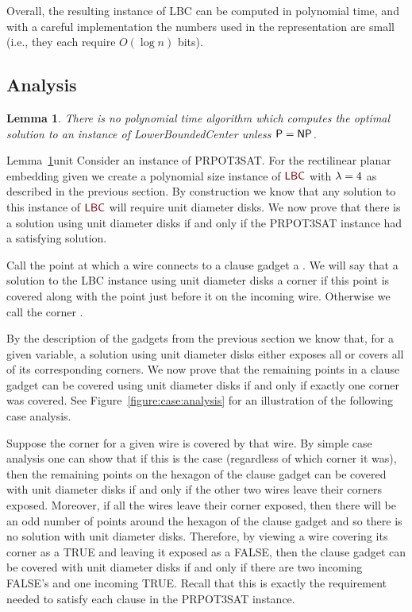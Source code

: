 \ifx\STACS\undefined \documentclass[12pt]{article}\else \documentclass[runningheads,a4paper]{llncs}
\newcommand{\PRPOTSAT}{\Term{PRPOT3SAT}\xspace}
\newcommand{\True}{\Term{TRUE}\xspace}
\newcommand{\False}{\Term{FALSE}\xspace}
\newcommand{\LowerBoundedCenter}   {\PStyle{{Lower{}Bounded{}Center}}\xspace}
\newcommand{\lbc}{\PStyle{LBC}\xspace}
\newcommand{\emphi}[1]{\emphic{#1}{#1}}
\newcommand{\PStyle}[1]{\textcolor{red25}{\textrm{\textsf{#1}}}}
\newtheorem{lemma}[theorem]{Lemma}\newtheorem{definition}[theorem]{Definition}
\newcommand{\Term}[1]{\textsf{#1}}
\newcommand{\lemlab}[1]{\label{lemma:#1}}
\newcommand{\lemref}[1]{Lemma~\ref{lemma:#1}}
\newcommand{\figref}[1]{Figure~\ref{figure:#1}}
\begin{document}
Overall, the resulting instance of \lbc can be computed in polynomial
time, and with a careful implementation the numbers used in the
representation are small (i.e., they each require $O( \log n)$ bits).

\subsection{Analysis}

\begin{lemma}
\lemlab{unit}
    There is no polynomial time algorithm which computes
    the optimal solution to an instance of \LowerBoundedCenter unless
    $\P=\NP$.
\end{lemma}

\begin{proof:in:appendix:e}{\lemref{unit}}{unit}
    Consider an instance of \PRPOTSAT.  For the rectilinear planar
    embedding given we create a polynomial size instance of $\lbc$
    with $\lambda=4$ as described in the previous section.  By
    construction we know that any solution to this instance of $\lbc$
    will require unit diameter disks.  We now prove that there is a
    solution using unit diameter disks if and only if the \PRPOTSAT
    instance had a satisfying solution.
    
    Call the point at which a wire connects to a clause gadget a
    \emphi{corner}.  We will say that a solution to the \lbc instance
    using unit diameter disks \emphi{covers} a corner if this point is
    covered along with the point just before it on the incoming wire.
    Otherwise we call the corner \emphi{exposed}.
    
    By the description of the gadgets from the previous section we
    know that, for a given variable, a solution using unit diameter
    disks either exposes all or covers all of its corresponding
    corners.  We now prove that the remaining points in a clause
    gadget can be covered using unit diameter disks if and only if
    exactly one corner was covered. See \figref{case:analysis} for an
    illustration of the following case analysis.
    
    Suppose the corner for a given wire is covered by that wire.  By
    simple case analysis one can show that if this is the case
    (regardless of which corner it was), then the remaining points on
    the hexagon of the clause gadget can be covered with unit diameter
    disks if and only if the other two wires leave their corners
    exposed.  Moreover, if all the wires leave their corner exposed,
    then there will be an odd number of points around the hexagon of
    the clause gadget and so there is no solution with unit diameter
    disks.  Therefore, by viewing a wire covering its corner as a
    \True and leaving it exposed as a \False, then the clause gadget
    can be covered with unit diameter disks if and only if there are
    two incoming \False's and one incoming \True.  Recall that this is
    exactly the requirement needed to satisfy each clause in the
    \PRPOTSAT instance. 
\end{proof:in:appendix:e}
\end{document}
